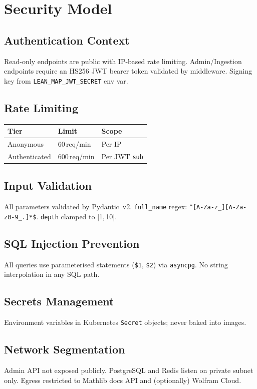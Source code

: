 \chapter{Security Model}

\section{Authentication Context}
Read-only endpoints are public with IP-based rate limiting.
Admin/Ingestion endpoints require an HS256 JWT bearer token validated by
middleware.  Signing key from \texttt{LEAN\_MAP\_JWT\_SECRET} env var.

\section{Rate Limiting}
\begin{table}[h]
\centering
\begin{tabular}{@{}lll@{}}
\toprule
\textbf{Tier} & \textbf{Limit} & \textbf{Scope} \\
\midrule
Anonymous     & 60\,req/min  & Per IP \\
Authenticated & 600\,req/min & Per JWT \texttt{sub} \\
\bottomrule
\end{tabular}
\end{table}

\section{Input Validation}
All parameters validated by Pydantic~v2.  \texttt{full\_name} regex:
\verb|^[A-Za-z_][A-Za-z0-9_.]*$|.  \texttt{depth} clamped to [1,\,10].

\section{SQL Injection Prevention}
All queries use parameterised statements (\texttt{\$1}, \texttt{\$2})
via \texttt{asyncpg}.  No string interpolation in any SQL path.

\section{Secrets Management}
Environment variables in Kubernetes \texttt{Secret} objects; never baked
into images.

\section{Network Segmentation}
Admin API not exposed publicly.  PostgreSQL and Redis listen on private
subnet only.  Egress restricted to Mathlib docs API and (optionally)
Wolfram Cloud.
